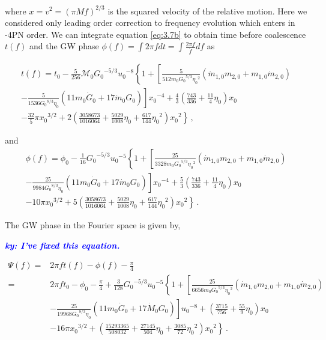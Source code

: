 \documentclass[11pt]{article}
\newcommand{\ky}[1]{\textcolor{blue}{\it{\textbf{ky: #1}}} }
\begin{document}
where $x=v^2=(\pi M f)^{2/3}$ is the squared velocity of the relative motion. Here we considered only leading order correction to frequency evolution which enters in -4PN order. We can integrate equation \eqref{eq:3.7b} to obtain time before coalescence $t(f)$ and the GW phase $\phi(f)=\int 2 \pi f dt=\int\frac{2\pi f}{\dot{f}}df$ as


\begin{align}
t(f)=t_0-\frac{5}{256}\mathcal{M}_0{G_0}^{-5/3}{u_0}^{-8}\left\{1+\left[\frac{5}{512 {m}_0{G_0}^{5/3}{\eta_0}^2}(\dot{m}_{1,0}m_{2,0}+m_{1,0}\dot{m}_{2,0})\right. \right. \nonumber \\ \left. \left. -\frac{5}{1536{G_0}^{8/3}\eta_0}(11m_0\dot{G}_0+17\dot{m}_0 G_0)\right]{x_0}^{-4}+\frac{4}{3}\left(\frac{743}{336}+\frac{11}{4}{\eta_0}\right)x_0 \right. \nonumber\\ \left. -\frac{32}{5}\pi {x_0}^{3/2}+2\left(\frac{3058673}{1016064}+\frac{5029}{1008}{\eta_0}+\frac{617}{144}{\eta_0}^2\right){x_0}^2 \right\}\,,
\end{align}


and
\begin{align}
\phi(f)=\phi_0-\frac{1}{16}{G_0}^{-5/3}{u_0}^{-5}\left\{1+\left[\frac{25}{3328 m_0 {G_0}^{5/3}{\eta_0}^2}(\dot{m}_{1,0}m_{2,0}+m_{1,0}\dot{m}_{2,0}) \right. \right. \nonumber\\ \left. \left. -\frac{25}{9984{G_0}^{8/3} \eta_0}(11m_0 \dot{G}_0+17\dot{m}_0 G_0)\right]{x_0}^{-4}+\frac{5}{3}\left(\frac{743}{336}+\frac{11}{4}{\eta_0}\right){x_0} \right. \nonumber\\ \left. -10 \pi {x_0}^{3/2}+5\left(\frac{3058673}{1016064}+\frac{5029}{1008}{\eta_0}+\frac{617}{144}{\eta_0}^{2}\right){x_0}^2\right\}\,.
\end{align}


\hspace{15.5pt}The GW phase in the Fourier space is given by,

\ky{I've fixed this equation.}

\begin{align}\label{eq:3.7c}
\Psi(f)=&2\pi ft(f)-\phi(f)-\frac{\pi}{4}\nonumber\\
=&2\pi f t_0-\phi_0-\frac{\pi}{4}+\frac{3}{128}{G_0}^{-5/3}{u_0}^{-5}\left\{1+\left[\frac{25}{6656m_0 {G_0}^{5/3}{\eta_0}^2}(\dot{m}_{1,0}m_{2,0}+m_{1,0}\dot{m}_{2,0}) \right. \right. \nonumber\\ 
&\left. \left. -\frac{25}{19968{G_0}^{8/3}\eta_0}(11m_0\dot{G}_0+17\dot{M}_0G_0)\right]{u_0}^{-8}+\left(\frac{3715}{756} +\frac{55}{9}{\eta_0}\right){x_0} \right. \nonumber\\ 
& \left. -16\pi {x_0}^{3/2}+\left(\frac{15293365}{508032}+\frac{27145}{504}{\eta_0}+\frac{3085}{72}{\eta_0}^2\right){x_0}^2\right\}\,.
\end{align}
\end{document}

